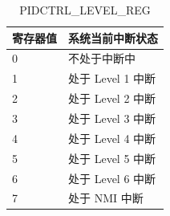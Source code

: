 
\begin{table}[H]
    \centering
    \caption{PIDCTRL\_LEVEL\_REG}
    \label{table:PIDCTRL_LEVEL_REG}
    \begin{tabular}{|p{6cm}|p{8cm}|}
        \hline
        \rowcolor{lightgray}
       寄存器值 & 系统当前中断状态 \\
        \hline
        0 & 不处于中断中 \\
        \hline
        1 & 处于 Level 1 中断 \\
        \hline
        2 & 处于 Level 2 中断 \\
        \hline
        3 & 处于 Level 3 中断 \\
        \hline
        4 & 处于 Level 4 中断 \\
        \hline
        5 & 处于 Level 5 中断 \\
        \hline
        6 & 处于 Level 6 中断 \\
        \hline
        7 & 处于 NMI 中断\\
        \hline
    \end{tabular}
\end{table}
